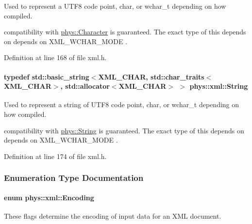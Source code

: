 Used to represent a UTF8 code point, char, or wchar\_\-t depending on how compiled. 

compatibility with \hyperlink{namespacephys_a3098bae5b0a3cd16eec331f766cc562b}{phys::Character} is guaranteed. The exact type of this depends on depends on XML\_\-WCHAR\_\-MODE . 

Definition at line 168 of file xml.h.

\hypertarget{namespacephys_1_1xml_a4d8ca7638328d16d303e5a4c849f4704}{
\paragraph[{String}]{\setlength{\rightskip}{0pt plus 5cm}typedef std::basic\_\-string$<$XML\_\-CHAR, std::char\_\-traits$<$XML\_\-CHAR$>$, std::allocator$<$XML\_\-CHAR$>$ $>$ {\bf phys::xml::String}}\hfill}
\label{namespacephys_1_1xml_a4d8ca7638328d16d303e5a4c849f4704}


Used to represent a string of UTF8 code point, char, or wchar\_\-t depending on how compiled. 

compatibility with \hyperlink{namespacephys_aa03900411993de7fbfec4789bc1d392e}{phys::String} is guaranteed. The exact type of this depends on depends on XML\_\-WCHAR\_\-MODE . 

Definition at line 174 of file xml.h.



\subsubsection{Enumeration Type Documentation}
\hypertarget{namespacephys_1_1xml_a420f5de782438f88160321385bea2015}{
\paragraph[{Encoding}]{\setlength{\rightskip}{0pt plus 5cm}enum {\bf phys::xml::Encoding}}\hfill}
\label{namespacephys_1_1xml_a420f5de782438f88160321385bea2015}


These flags determine the encoding of input data for an XML document. 

